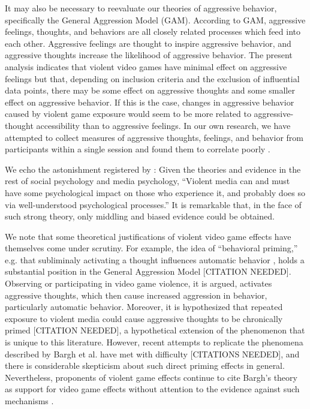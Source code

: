 \documentclass[man]{apa6}
\begin{document}
It may also be necessary to reevaluate our theories of aggressive behavior, specifically the General Aggression Model (GAM). According to GAM, aggressive feelings, thoughts, and behaviors are all closely related processes which feed into each other. Aggressive feelings are thought to inspire aggressive behavior, and aggressive thoughts increase the likelihood of aggressive behavior. The present analysis indicates that violent video games have minimal effect on aggressive feelings \citep[a finding paralleled by][]{Przybylski:etal:2014} but that, depending on inclusion criteria and the exclusion of influential data points, there may be some effect on aggressive thoughts and some smaller effect on aggressive behavior. If this is the case, changes in aggressive behavior caused by violent game exposure would seem to be more related to aggressive-thought accessibility than to aggressive feelings. In our own research, we have attempted to collect measures of aggressive thoughts, feelings, and behavior from participants within a single session and found them to correlate poorly \citep{Engelhardt:etal:2015}.

We echo the astonishment registered by \citet[p. 62]{Warburton:2014}: Given the theories and evidence in the rest of social psychology and media psychology, ``Violent media can and must have some psychological impact on those who experience it, and probably does so via well-understood psychological processes.'' It is remarkable that, in the face of such strong theory, only middling and biased evidence could be obtained. 

We note that some theoretical justifications of violent video game effects have themselves come under scrutiny. For example, the idea of ``behavioral priming,'' e.g. that subliminaly activating a thought influences automatic behavior \citep{Bargh:etal:1996}, holds a substantial position in the General Aggression Model [CITATION NEEDED]. Observing or participating in video game violence, it is argued, activates aggressive thoughts, which then cause increased aggression in behavior, particularly automatic behavior. Moreover, it is hypothesized that repeated exposure to violent media could cause aggressive thoughts to be chronically primed [CITATION NEEDED], a hypothetical extension of the phenomenon that is unique to this literature. However, recent attempts to replicate the phenomena described by Bargh et al. have met with difficulty [CITATIONS NEEDED], and there is considerable skepticism about such direct priming effects in general. Nevertheless, proponents of violent game effects continue to cite Bargh's theory as support for video game effects without attention to the evidence against such mechanisms \citep{Prot:Anderson:2013,Anderson:etal:2015}. %
\end{document}
